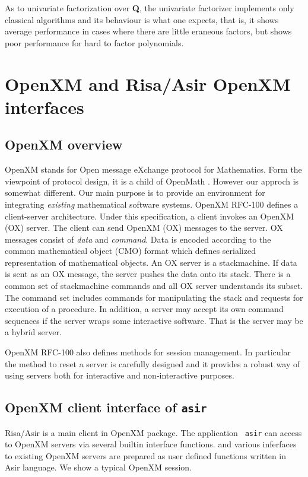 \documentclass[runningheads]{cl2emult}
\begin{document}
As to univariate factorization over {\bf Q},
the univariate factorizer implements only classical
algorithms and its behaviour is what one expects,
that is, it shows average performance in cases
where there are little eraneous factors, but
shows poor performance for hard to factor polynomials.

\section{OpenXM and Risa/Asir OpenXM interfaces}

\subsection{OpenXM overview}

OpenXM stands for Open message eXchange protocol for Mathematics.
Form the viewpoint of protocol design, it is a child of OpenMath
\cite{OPENMATH}.  However our approch is somewhat different. Our main
purpose is to provide an environment for integrating {\it existing}
mathematical software systems. OpenXM RFC-100 \cite{RFC100} defines a
client-server architecture.  Under this specification, a client
invokes an OpenXM (OX) server.  The client can send OpenXM (OX)
messages to the server.  OX messages consist of {\it data} and {\it
command}. Data is encoded according to the common mathematical object
(CMO) format which defines serialized representation of mathematical
objects.  An OX server is a stackmachine. If data is sent as an OX
message, the server pushes the data onto its stack. There is a common
set of stackmachine commands and all OX server understands its subset. 
The command set includes commands for manipulating the stack and
requests for execution of a procedure. In addition, a server may
accept its own command sequences if the server wraps some interactive
software. That is the server may be a hybrid server.

OpenXM RFC-100 also defines methods for session management. In particular
the method to reset a server is carefully designed and it provides
a robust way of using servers both for interactive and non-interactive
purposes.

\subsection{OpenXM client interface of {\tt asir}}

Risa/Asir is a main client in OpenXM package.  The application {\tt
asir} can access to OpenXM servers via several builtin interface
functions. and various inferfaces to existing OpenXM servers are
prepared as user defined functions written in Asir language.  We show
a typical OpenXM session.
\end{document}

